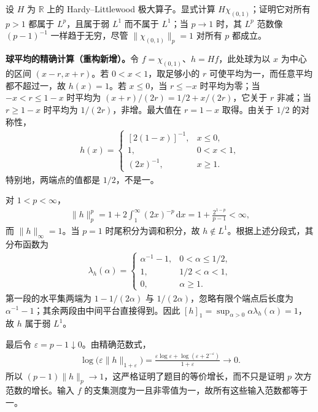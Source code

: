 \documentclass[../../main.tex]{subfiles}
\begin{document}
\begin{exercise}\label{exercise:ch06-maximal-indicator}
设 $H$ 为 $\mathbb R$ 上的 Hardy–Littlewood 极大算子。显式计算 $H\chi_{(0,1)}$；证明它对所有 $p>1$ 都属于 $L^p$，且属于弱 $L^1$ 而不属于 $L^1$；当 $p\to1$ 时，其 $L^p$ 范数像 $(p-1)^{-1}$ 一样趋于无穷，尽管 $\|\chi_{(0,1)}\|_p=1$ 对所有 $p$ 都成立。
\end{exercise}
\begin{solution}
\textbf{球平均的精确计算（重构新增）。}令 $f=\chi_{(0,1)}$、$h=Hf$，此处球为以 $x$ 为中心的区间 $(x-r,x+r)$。若 $0<x<1$，取足够小的 $r$ 可使平均为一，而任意平均都不超过一，故 $h(x)=1$。若 $x\leqslant0$，当 $r\leqslant-x$ 时平均为零；当 $-x<r\leqslant1-x$ 时平均为 $(x+r)/(2r)=1/2+x/(2r)$，它关于 $r$ 非减；当 $r\geqslant1-x$ 时平均为 $1/(2r)$，非增。最大值在 $r=1-x$ 取得。由关于 $1/2$ 的对称性，
\begin{align*}
h(x)=\begin{cases}
[2(1-x)]^{-1},&x\leqslant0,\\
1,&0<x<1,\\
(2x)^{-1},&x\geqslant1.
\end{cases}
\end{align*}
特别地，两端点的值都是 $1/2$，不是一。

对 $1<p<\infty$，
\begin{align*}
\|h\|_p^p=1+2\int_1^\infty(2x)^{-p}\,\mathrm dx
=1+\frac{2^{1-p}}{p-1}<\infty,
\end{align*}
而 $\|h\|_\infty=1$。当 $p=1$ 时尾积分为调和积分，故 $h\notin L^1$。根据上述分段式，其分布函数为
\begin{align*}
\lambda_h(\alpha)=\begin{cases}
\alpha^{-1}-1,&0<\alpha\leqslant1/2,\\
1,&1/2<\alpha<1,\\
0,&\alpha\geqslant1.
\end{cases}
\end{align*}
第一段的水平集两端为 $1-1/(2\alpha)$ 与 $1/(2\alpha)$，忽略有限个端点后长度为 $\alpha^{-1}-1$；其余两段由中间平台直接得到。因此
$[h]_1=\sup_{\alpha>0}\alpha\lambda_h(\alpha)=1$，故 $h$ 属于弱 $L^1$。

最后令 $\varepsilon=p-1\downarrow0$。由精确范数式，
\begin{align*}
\log\bigl(\varepsilon\|h\|_{1+\varepsilon}\bigr)
=\frac{\varepsilon\log\varepsilon+\log(\varepsilon+2^{-\varepsilon})}{1+\varepsilon}
\longrightarrow0.
\end{align*}
所以 $(p-1)\|h\|_p\to1$，这严格证明了题目的等价增长，而不只是证明 $p$ 次方范数的增长。输入 $f$ 的支集测度为一且非零值为一，故所有这些输入范数都等于一。
\end{solution}
\end{document}
